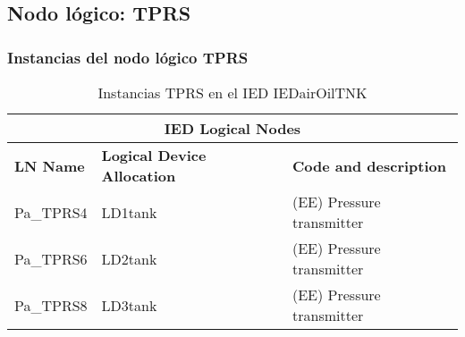 
\subsection{Nodo l\'ogico: 			 TPRS}

    \subsubsection{Instancias del nodo l\'ogico TPRS}
    \begin{table}[H]
    \begin{center}
    \begin{tabular}{|l|l|p{6.8cm}|}
            \hline
            \multicolumn{3}{|c|}{\cellcolor[gray]{0.8} \textbf{IED Logical Nodes} } \\
            \hline
            \textbf{LN Name} & \textbf{Logical Device Allocation} & \textbf{Code and description} \\
            \hline
            Pa\_TPRS4 & LD1tank & (EE) Pressure transmitter \\
            \hline
            Pa\_TPRS6 & LD2tank & (EE) Pressure transmitter \\
            \hline
            Pa\_TPRS8 & LD3tank & (EE) Pressure transmitter \\
            \hline
    \end{tabular}
    \caption{Instancias TPRS en el IED IEDairOilTNK}
    \label{table:lnInstTPRS_trans}
    \end{center}
    \end{table}
    
    
    
